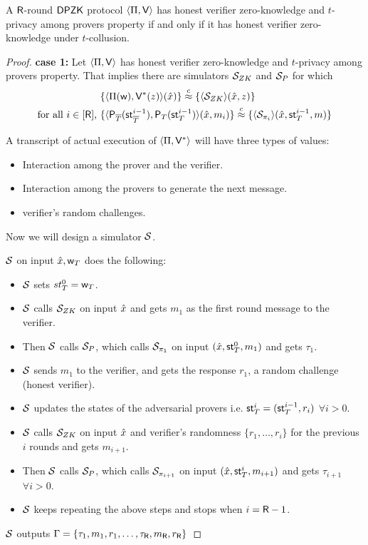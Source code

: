 \begin{theorem}\label{theo:equivalent}
	A $\mathsf{R}$-round $\mathsf{DPZK}$ protocol $\langle \Pi,\mathsf{V}\rangle$ has honest verifier zero-knowledge and $t$-privacy among provers property if and only if it has honest verifier zero-knowledge under $t$-collusion.
\end{theorem}

\begin{proof}
	\textbf{case 1:} Let $\langle \Pi,\mathsf{V}\rangle$ has honest verifier zero-knowledge and $t$-privacy among provers property. That implies there are simulators $\mathcal{S}_{ZK}$ and $\mathcal{S}_{P}$ for which 
	\begin{align}
	&\{ \langle  \Pi( \mathsf{w} ) , \mathsf{V}^*( z ) \rangle ( \hat{x}) \} \stackrel{c}{\approx} \{ \langle \mathcal{S}_{ZK} \rangle(\hat{x}, z) \}\\        
	\text{for all }i \in [\mathsf{R}] \text{, } &\{ \langle  \mathsf{P}_{\overline{T}}( \mathsf{st}^{i-1}_{\overline{T}} ) , \mathsf{P}_T ( \mathsf{st}^{i-1}_T ) \rangle ( \hat{x}  , m_i) \}
	\stackrel{c}{\approx} \{ \langle \mathcal{S}_{\pi_i} \rangle (\hat{x}, \mathsf{st}^{i-1}_T, m) \}
	\end{align}
	
	A transcript of actual execution of $\langle \Pi,\mathsf{V}^*\rangle$ will have three types of values:
	
	\begin{itemize}
		\item Interaction among the prover and the verifier.
		\item Interaction among the provers to generate the next message.
		\item verifier's random challenges.         
	\end{itemize}
	Now we will design a simulator $\mathcal{S}$.
	
	$\mathcal{S}$ on input $\hat{x}, \mathsf{w}_T$ does the following: 
	\begin{itemize}
		\item $\mathcal{S}$ sets $st^0_T = \mathsf{w}_T$.
		\item $\mathcal{S}$ calls $\mathcal{S}_{ZK}$ on input $\hat{x}$ and gets $m_{1}$ as the first round message to the verifier.
		\item Then $\mathcal{S}$ calls $\mathcal{S}_{P}$, which calls $\mathcal{S}_{\pi_1}$ on input $(\hat{x}, \mathsf{st}^0_T , m_{1})$ and gets $\tau_{1}$.
		\item $\mathcal{S}$ sends $m_1$ to the verifier, and gets the response $r_1$, a random challenge (honest verifier).
		\item $\mathcal{S}$ updates the states of the adversarial provers i.e. $\mathsf{st}^i_T = (\mathsf{st}^{i-1}_T, r_i)$ $\forall i>0$.
		\item $\mathcal{S}$ calls $\mathcal{S}_{ZK}$ on input $\hat{x}$ and verifier's randomness $\{r_1, \ldots, r_i\}$ for the previous $i$ rounds and gets $m_{i+1}$.
		\item Then $\mathcal{S}$ calls $\mathcal{S}_{P}$, which calls $\mathcal{S}_{\pi_{i+1}}$ on input $(\hat{x}, \mathsf{st}^{i}_T , m_{i+1})$ and gets $\tau_{i+1}$ $\forall i>0$. 
		\item $\mathcal{S}$ keeps repeating the above steps and stops when $i=\mathsf{R} - 1$. 
	\end{itemize}
	$\mathcal{S}$ outputs $\Gamma = \{\tau_1, m_1 ,r_1, \ldots, \tau_{\mathsf{R}}, m_{\mathsf{R}}, r_{\mathsf{R}} \}$ 
	

\end{proof}
